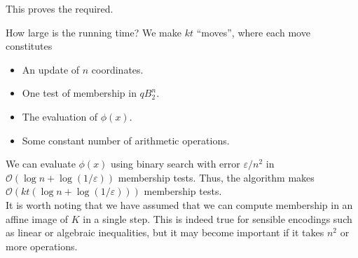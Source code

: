 This proves the required.

How large is the running time? We make $kt$ ``moves'', where each move constitutes
\begin{itemize}
	\item An update of $n$ coordinates.
	\item One test of membership in $qB_2^n$.
	\item The evaluation of $\phi(x)$.
	\item Some constant number of arithmetic operations.
\end{itemize}

We can evaluate $\phi(x)$ using binary search with error $\varepsilon/n^2$ in $\mathcal{O}(\log n + \log(1/\varepsilon))$ membership tests. Thus, the algorithm makes $\mathcal{O}(kt(\log n + \log(1/\varepsilon)))$ membership tests.\\
It is worth noting that we have assumed that we can compute membership in an affine image of $K$ in a single step. This is indeed true for sensible encodings such as linear or algebraic inequalities, but it may become important if it takes $n^2$ or more operations.